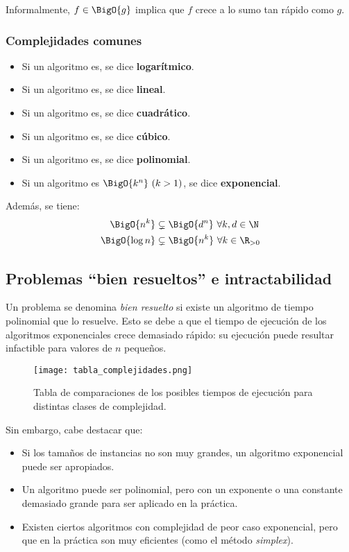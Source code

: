 Informalmente, $f \in \BigO{g}$ implica que $f$ crece a lo sumo tan rápido como $g$.

\subsubsection{Complejidades comunes}

\begin{itemize}
    \item Si un algoritmo es, se dice \textbf{logarítmico}.
    \item Si un algoritmo es, se dice \textbf{lineal}.
    \item Si un algoritmo es, se dice \textbf{cuadrático}.
    \item Si un algoritmo es, se dice \textbf{cúbico}.
    \item Si un algoritmo es, se dice \textbf{polinomial}.
    \item Si un algoritmo es $\BigO{k^n}\ (k > 1)$, se dice \textbf{exponencial}.
\end{itemize}

Además, se tiene:
\begin{align*}
    \BigO{n^k}     & \subsetneq \BigO{d^n}\ \forall k, d \in \N   \\
    \BigO{\log{n}} & \subsetneq \BigO{n^k}\ \forall k \in \R_{>0}
\end{align*}

\subsection{Problemas ``bien resueltos'' e intractabilidad}

Un problema se denomina \textit{bien resuelto} si existe un algoritmo de tiempo polinomial que lo resuelve. Esto se debe a que el tiempo de ejecución de los algoritmos exponenciales crece demasiado rápido: su ejecución puede resultar infactible para valores de $n$ pequeños.

\begin{figure}[H]
    \centering
    \texttt{[image: tabla\_complejidades.png]}
    \caption*{Tabla de comparaciones de los posibles tiempos de ejecución para distintas clases de complejidad.}
\end{figure}

Sin embargo, cabe destacar que:
\begin{itemize}
    \item Si los tamaños de instancias no son muy grandes, un algoritmo exponencial puede ser apropiados.
    \item Un algoritmo puede ser polinomial, pero con un exponente o una constante demasiado grande para ser aplicado en la práctica.
    \item Existen ciertos algoritmos con complejidad de peor caso exponencial, pero que en la práctica son muy eficientes (como el método \textit{simplex}).
\end{itemize}


